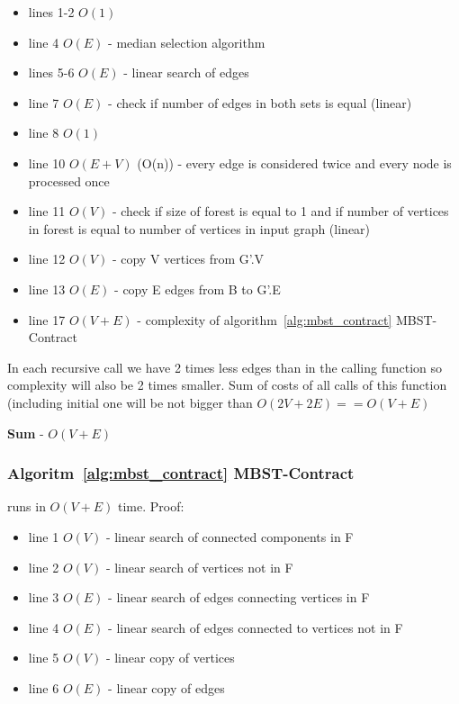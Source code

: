 \documentclass[runningheads, a4paper]{llncs}
\begin{document}
\begin{itemize}
  \item lines 1-2 $O(1)$ 
  \item line 4 $O(E)$ - median selection algorithm \cite{cormen_9}
  \item lines 5-6 $O(E)$ - linear search of edges
  \item line 7 $O(E)$ - check if number of edges  in both sets is equal (linear)
  \item line 8 $O(1)$
  \item line 10 $O(E+V)$ (O(n)) - every edge is considered twice and every node is processed once
  \item line 11 $O(V)$ - check if size of forest is equal to 1 and if number of vertices in forest is equal to number of vertices in input graph (linear)
  \item line 12 $O(V)$ - copy V vertices from G'.V
  \item line 13 $O(E)$ - copy E edges from B to G'.E
  \item line 17 $O(V+E)$ - complexity of algorithm~\ref{alg:mbst_contract} MBST-Contract
\end{itemize}

In each recursive call we have 2 times less edges than in the calling function so complexity will also be 2 times smaller. Sum of costs of all calls of this function (including initial one will be not bigger than $O(2V + 2E) == O(V+E)$

\textbf{Sum} - $O(V + E)$
\subsubsection{Algoritm~\ref{alg:mbst_contract} MBST-Contract}
runs in $O(V+E)$ time. Proof:

\begin{itemize}
    \item line 1 $O(V)$ - linear search of connected components in F
    \item line 2 $O(V)$ - linear search of vertices not in F
    \item line 3 $O(E)$ - linear search of edges connecting vertices in F
    \item line 4 $O(E)$ - linear search of edges connected to vertices not in F
    \item line 5 $O(V)$ - linear copy of vertices
    \item line 6 $O(E)$ - linear copy of edges
\end{itemize}
\end{document}
